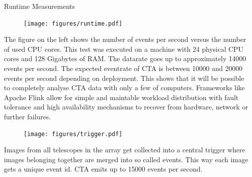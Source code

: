 \begin{multicols}{2}
    \begin{block}[]{Runtime Measurements}%
      \begin{multicols}{2}
        \begin{figure}
          \texttt{[image: figures/runtime.pdf]}\\
        \end{figure}
        \columnbreak
          The figure on the left shows the number of events per second versus the number of used CPU cores.
          This test was executed on a machine with 24 physical CPU cores and 128 Gigabytes of RAM.
          The datarate goes up to approximately \num{14000} events per second. The expected eventrate of CTA is between
          \num{10000} and \num{20000} events per second depending on deployment.
          This shows that it will be possible to completely analyse CTA data with only a few of computers.
          Frameworks like Apache Flink allow for simple and maintable workload distribution with fault tolerance and high availability mechanisms to recover from hardware, network or further failures.
      \end{multicols}
    \end{block}%


    \columnbreak

        \begin{center}

        \begin{streamblock}[equal height group=C, width=0.8\linewidth]{0mm}{-5mm}{}%
          \begin{multicols}{2}
            \begin{figure}
              \texttt{[image: figures/trigger.pdf]}
            \end{figure}
            \columnbreak
            Images from all telescopes in the array get collected into a central trigger where images belonging together are merged into so called events.
            This way each image gets a unique event id.
            CTA emits up to \num{15 000} events per second\cite{trigger}.
          \end{multicols}
        \end{streamblock}%


\end{center}
\end{multicols}
